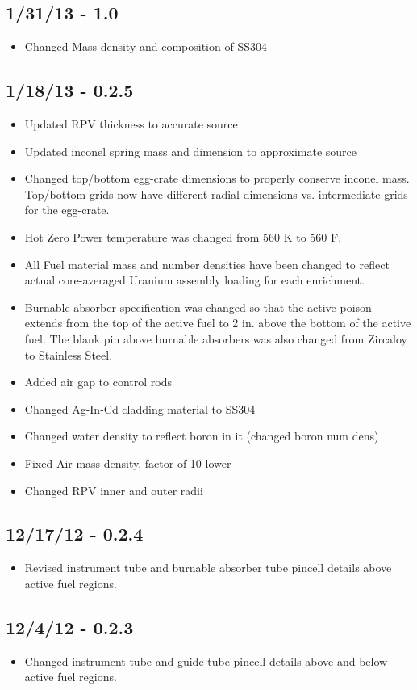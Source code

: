 \subsection*{1/31/13 - 1.0}
\begin{itemize}
  \item Changed Mass density and composition of SS304
\end{itemize}

\subsection*{1/18/13 - 0.2.5}
\begin{itemize}
  \item Updated RPV thickness to accurate source
  \item Updated inconel spring mass and dimension to approximate source
  \item Changed top/bottom egg-crate dimensions to properly conserve inconel
  mass. Top/bottom grids now have different radial dimensions vs. intermediate
  grids for the egg-crate.
  \item Hot Zero Power temperature was changed from 560 K to 560 F.
  \item All Fuel material mass and number densities have been changed to reflect
  actual core-averaged Uranium assembly loading for each enrichment.
  \item Burnable absorber specification was changed so that the active poison
  extends from the top of the active fuel to 2 in. above the bottom of the
  active fuel. The blank pin above burnable absorbers was also changed from
  Zircaloy to Stainless Steel.
  \item Added air gap to control rods
  \item Changed Ag-In-Cd cladding material to SS304
  \item Changed water density to reflect boron in it (changed boron num dens)
  \item Fixed Air mass density, factor of 10 lower
  \item Changed RPV inner and outer radii
\end{itemize}

\subsection*{12/17/12 - 0.2.4}
\begin{itemize}
  \item Revised instrument tube and burnable absorber tube pincell details above
  active fuel regions.
\end{itemize}

\subsection*{12/4/12 - 0.2.3}
\begin{itemize}
  \item Changed instrument tube and guide tube pincell details above and below
  active fuel regions.
\end{itemize}
